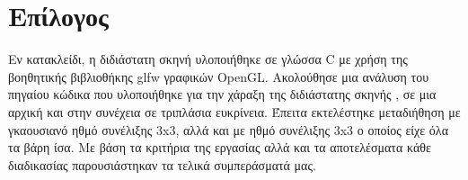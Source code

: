 \documentclass[12pt]{article}
\begin{document}
\section{Επίλογος}
Εν κατακλείδι, η διδιάστατη σκηνή υλοποιήθηκε σε γλώσσα C με χρήση της βοηθητικής βιβλιοθήκης glfw γραφικών OpenGL. Ακολούθησε μια ανάλυση του πηγαίου κώδικα που υλοποιήθηκε για την χάραξη της διδιάστατης σκηνής , σε μια αρχική και στην συνέχεια σε τριπλάσια ευκρίνεια. Έπειτα εκτελέστηκε μεταδιήθηση με γκαουσιανό ηθμό συνέλιξης 3x3, αλλά και με ηθμό συνέλιξης 3x3 ο οποίος είχε όλα τα βάρη ίσα. Με βάση τα κριτήρια της εργασίας αλλά και τα αποτελέσματα κάθε διαδικασίας παρουσιάστηκαν τα τελικά συμπεράσματά μας.



\printglossary




\end{document}
